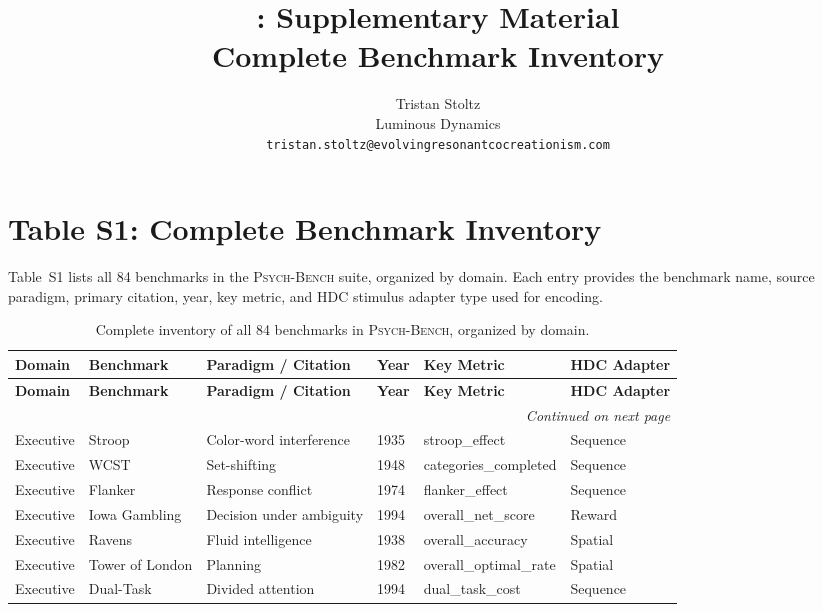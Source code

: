 \documentclass[10pt,landscape]{article}
\title{\psychbench{}: Supplementary Material\\
\large Complete Benchmark Inventory}
\author{Tristan Stoltz\\
Luminous Dynamics\\
\texttt{tristan.stoltz@evolvingresonantcocreationism.com}}
\date{}
\newcommand{\psychbench}{\textsc{Psych-Bench}}
\begin{document}
\maketitle

\section*{Table S1: Complete Benchmark Inventory}

Table~S1 lists all 84 benchmarks in the \psychbench{} suite, organized by domain. Each entry provides the benchmark name, source paradigm, primary citation, year, key metric, and HDC stimulus adapter type used for encoding.

\renewcommand{\arraystretch}{1.15}
\begin{longtable}{@{}p{2.3cm}p{3.0cm}p{4.5cm}p{0.6cm}p{3.8cm}p{1.8cm}@{}}
\caption{Complete inventory of all 84 benchmarks in \psychbench{}, organized by domain.} \label{tab:s1} \\
\toprule
\textbf{Domain} & \textbf{Benchmark} & \textbf{Paradigm / Citation} & \textbf{Year} & \textbf{Key Metric} & \textbf{HDC Adapter} \\
\midrule
\endfirsthead
\toprule
\textbf{Domain} & \textbf{Benchmark} & \textbf{Paradigm / Citation} & \textbf{Year} & \textbf{Key Metric} & \textbf{HDC Adapter} \\
\midrule
\endhead
\midrule
\multicolumn{6}{r}{\emph{Continued on next page}} \\
\endfoot
\bottomrule
\endlastfoot

Executive & Stroop & Color-word interference \citep{stroop1935interference} & 1935 & stroop\_effect & Sequence \\
Executive & WCST & Set-shifting \citep{berg1948simple} & 1948 & categories\_completed & Sequence \\
Executive & Flanker & Response conflict \citep{eriksen1974effects} & 1974 & flanker\_effect & Sequence \\
Executive & Iowa Gambling & Decision under ambiguity \citep{bechara1994insensitivity} & 1994 & overall\_net\_score & Reward \\
Executive & Ravens & Fluid intelligence \citep{raven1938progressive} & 1938 & overall\_accuracy & Spatial \\
Executive & Tower of London & Planning \citep{shallice1982specific} & 1982 & overall\_optimal\_rate & Spatial \\
Executive & Dual-Task & Divided attention \citep{pashler1994dual} & 1994 & dual\_task\_cost & Sequence \\


\end{longtable}
\end{document}
